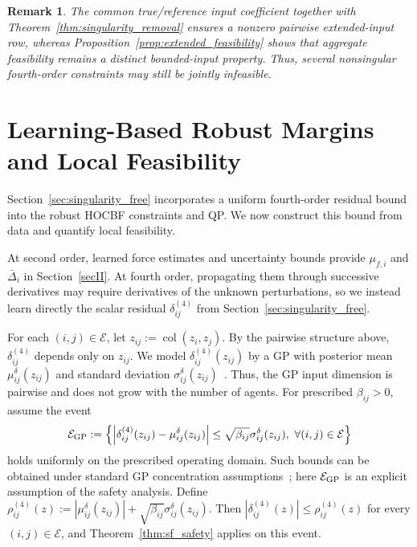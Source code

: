 \documentclass[journal,twoside,web]{ieeecolor}
\newtheorem{remark}[theorem]{Remark}
\begin{document}
\begin{remark}

The common true/reference input coefficient
together with Theorem~\ref{thm:singularity_removal} ensures a nonzero pairwise extended-input row, whereas Proposition~\ref{prop:extended_feasibility} shows that aggregate
feasibility remains a distinct bounded-input property.
Thus, several nonsingular fourth-order constraints may
still be jointly infeasible.
\end{remark}

\section{Learning-Based Robust Margins and Local Feasibility}
\label{sec:robust_singularity_free_safety}
Section~\ref{sec:singularity_free} incorporates a uniform fourth-order residual
bound into the robust HOCBF constraints and QP. We now construct this bound from data and quantify local feasibility.

At second order, learned force estimates and uncertainty bounds
provide $\mu_{f,i}$ and $\bar\Delta_i$ in Section~\ref{secII}. At fourth order,
propagating them through successive derivatives may require derivatives
of the unknown perturbations, so we instead learn directly the scalar
residual $\delta_{ij}^{(4)}$ from Section~\ref{sec:singularity_free}.

For each $(i,j)\in\mathcal E$, let
$z_{ij}:=\operatorname{col}(z_i,z_j)$. By the pairwise
structure above, $\delta_{ij}^{(4)}$ depends only on $z_{ij}$.
We model $\delta_{ij}^{(4)}(z_{ij})$ by a GP with posterior
mean $\mu_{ij}^{\delta}(z_{ij})$ and standard deviation
$\sigma_{ij}^{\delta}(z_{ij})$~\cite{rasmussen2006gpml}. Thus, the GP
input dimension is pairwise and does not grow with the number of agents.
For prescribed $\beta_{ij}>0$, assume the event
\[
\mathcal E_{\rm GP}:=
\left\{
\left|
\delta_{ij}^{(4)}(z_{ij})-\mu_{ij}^{\delta}(z_{ij})
\right|
\le
\sqrt{\beta_{ij}}\sigma_{ij}^{\delta}(z_{ij}),
\ \forall (i,j)\in\mathcal E
\right\}
\]
holds uniformly on the prescribed operating domain. Such bounds can be
obtained under standard GP concentration assumptions~\cite{srinivas2010gpucb};
here $\mathcal E_{\rm GP}$ is an explicit assumption of the safety analysis.
Define $\rho_{ij}^{(4)}(z):=
|\mu_{ij}^{\delta}(z_{ij})|
+\sqrt{\beta_{ij}}\sigma_{ij}^{\delta}(z_{ij})$.
Then $|\delta_{ij}^{(4)}(z)|\le\rho_{ij}^{(4)}(z)$
for every $(i,j)\in\mathcal E$, and
Theorem~\ref{thm:sf_safety} applies on this event.
\end{document}
